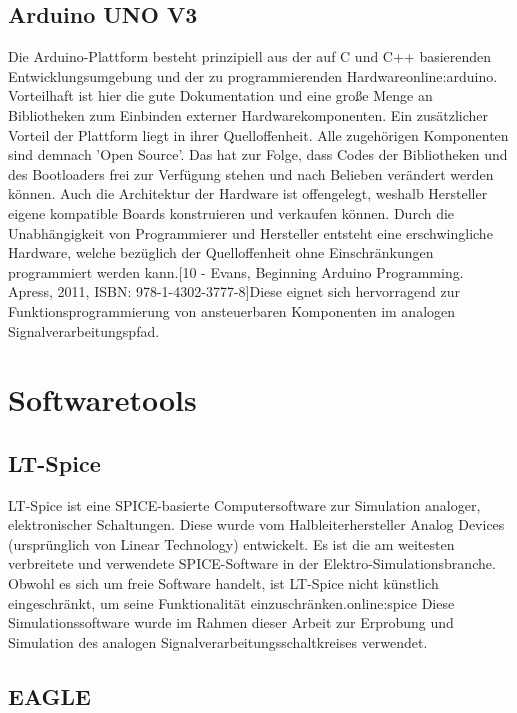 \subsection{Arduino UNO V3}
\label{subsec:unov3}

Die Arduino-Plattform besteht prinzipiell aus der auf C und C++ basierenden Entwicklungsumgebung und der zu programmierenden Hardware\gls{online:arduino}. Vorteilhaft ist hier die gute Dokumentation und eine große Menge an Bibliotheken zum Einbinden externer Hardwarekomponenten. Ein zusätzlicher Vorteil der Plattform liegt in ihrer Quelloffenheit. Alle zugehörigen Komponenten sind demnach 'Open Source'. Das hat zur Folge, dass Codes der Bibliotheken und des Bootloaders frei zur Verfügung stehen und nach Belieben verändert werden können. Auch die Architektur der Hardware ist offengelegt, weshalb Hersteller eigene kompatible Boards konstruieren und verkaufen können. Durch die Unabhängigkeit von Programmierer und Hersteller entsteht eine erschwingliche Hardware, welche bezüglich der Quelloffenheit ohne Einschränkungen programmiert werden kann.[10 - Evans, Beginning Arduino Programming. Apress, 2011, ISBN: 978-1-4302-3777-8]Diese eignet sich hervorragend zur Funktionsprogrammierung von ansteuerbaren Komponenten im analogen Signalverarbeitungspfad.

\section{Softwaretools}       
\subsection{LT-Spice}
\label{subsec:lts}
LT-Spice ist eine SPICE-basierte Computersoftware zur Simulation analoger, elektronischer Schaltungen. Diese wurde vom Halbleiterhersteller Analog Devices (ursprünglich von Linear Technology) entwickelt. Es ist die am weitesten verbreitete und verwendete SPICE-Software in der Elektro-Simulationsbranche. Obwohl es sich um freie Software handelt, ist LT-Spice nicht künstlich eingeschränkt, um seine Funktionalität einzuschränken.\gls{online:spice} Diese Simulationssoftware wurde im Rahmen dieser Arbeit zur Erprobung und Simulation des analogen Signalverarbeitungsschaltkreises verwendet.

\subsection{EAGLE}
\label{subsec:eagle}

